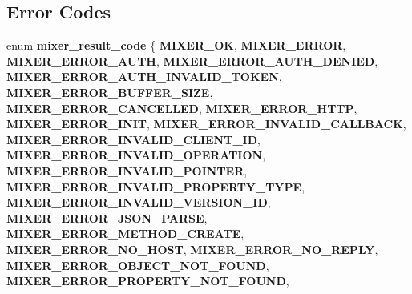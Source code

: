\subsection*{Error Codes}
\begin{DoxyCompactItemize}
\item 
\mbox{\label{group___interactivity_ga174546a7b8b4e14a1f28ff39e6bac482}} 
enum {\bfseries mixer\+\_\+result\+\_\+code} \{ \newline
{\bfseries M\+I\+X\+E\+R\+\_\+\+OK}, 
{\bfseries M\+I\+X\+E\+R\+\_\+\+E\+R\+R\+OR}, 
{\bfseries M\+I\+X\+E\+R\+\_\+\+E\+R\+R\+O\+R\+\_\+\+A\+U\+TH}, 
{\bfseries M\+I\+X\+E\+R\+\_\+\+E\+R\+R\+O\+R\+\_\+\+A\+U\+T\+H\+\_\+\+D\+E\+N\+I\+ED}, 
\newline
{\bfseries M\+I\+X\+E\+R\+\_\+\+E\+R\+R\+O\+R\+\_\+\+A\+U\+T\+H\+\_\+\+I\+N\+V\+A\+L\+I\+D\+\_\+\+T\+O\+K\+EN}, 
{\bfseries M\+I\+X\+E\+R\+\_\+\+E\+R\+R\+O\+R\+\_\+\+B\+U\+F\+F\+E\+R\+\_\+\+S\+I\+ZE}, 
{\bfseries M\+I\+X\+E\+R\+\_\+\+E\+R\+R\+O\+R\+\_\+\+C\+A\+N\+C\+E\+L\+L\+ED}, 
{\bfseries M\+I\+X\+E\+R\+\_\+\+E\+R\+R\+O\+R\+\_\+\+H\+T\+TP}, 
\newline
{\bfseries M\+I\+X\+E\+R\+\_\+\+E\+R\+R\+O\+R\+\_\+\+I\+N\+IT}, 
{\bfseries M\+I\+X\+E\+R\+\_\+\+E\+R\+R\+O\+R\+\_\+\+I\+N\+V\+A\+L\+I\+D\+\_\+\+C\+A\+L\+L\+B\+A\+CK}, 
{\bfseries M\+I\+X\+E\+R\+\_\+\+E\+R\+R\+O\+R\+\_\+\+I\+N\+V\+A\+L\+I\+D\+\_\+\+C\+L\+I\+E\+N\+T\+\_\+\+ID}, 
{\bfseries M\+I\+X\+E\+R\+\_\+\+E\+R\+R\+O\+R\+\_\+\+I\+N\+V\+A\+L\+I\+D\+\_\+\+O\+P\+E\+R\+A\+T\+I\+ON}, 
\newline
{\bfseries M\+I\+X\+E\+R\+\_\+\+E\+R\+R\+O\+R\+\_\+\+I\+N\+V\+A\+L\+I\+D\+\_\+\+P\+O\+I\+N\+T\+ER}, 
{\bfseries M\+I\+X\+E\+R\+\_\+\+E\+R\+R\+O\+R\+\_\+\+I\+N\+V\+A\+L\+I\+D\+\_\+\+P\+R\+O\+P\+E\+R\+T\+Y\+\_\+\+T\+Y\+PE}, 
{\bfseries M\+I\+X\+E\+R\+\_\+\+E\+R\+R\+O\+R\+\_\+\+I\+N\+V\+A\+L\+I\+D\+\_\+\+V\+E\+R\+S\+I\+O\+N\+\_\+\+ID}, 
{\bfseries M\+I\+X\+E\+R\+\_\+\+E\+R\+R\+O\+R\+\_\+\+J\+S\+O\+N\+\_\+\+P\+A\+R\+SE}, 
\newline
{\bfseries M\+I\+X\+E\+R\+\_\+\+E\+R\+R\+O\+R\+\_\+\+M\+E\+T\+H\+O\+D\+\_\+\+C\+R\+E\+A\+TE}, 
{\bfseries M\+I\+X\+E\+R\+\_\+\+E\+R\+R\+O\+R\+\_\+\+N\+O\+\_\+\+H\+O\+ST}, 
{\bfseries M\+I\+X\+E\+R\+\_\+\+E\+R\+R\+O\+R\+\_\+\+N\+O\+\_\+\+R\+E\+P\+LY}, 
{\bfseries M\+I\+X\+E\+R\+\_\+\+E\+R\+R\+O\+R\+\_\+\+O\+B\+J\+E\+C\+T\+\_\+\+N\+O\+T\+\_\+\+F\+O\+U\+ND}, 
\newline
{\bfseries M\+I\+X\+E\+R\+\_\+\+E\+R\+R\+O\+R\+\_\+\+P\+R\+O\+P\+E\+R\+T\+Y\+\_\+\+N\+O\+T\+\_\+\+F\+O\+U\+ND}, 

\end{DoxyCompactItemize}

